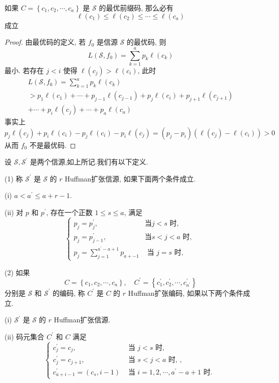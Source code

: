 \begin{lemma}
    如果 $ C=\left\{c_{1}, c_{2}, \cdots, c_{a}\right\} $ 是 $ \mathscr{S} $ 的最优前缀码, 那么必有
$$
\ell\left(c_{1}\right) \leq \ell\left(c_{2}\right) \leq \cdots \leq \ell\left(c_{a}\right)
$$
成立
\end{lemma}
\begin{proof}
 由最优码的定义, 若 $ f_{0} $ 是信源 $ \mathscr{S} $ 的最优码, 则
$$
L\left(\mathscr{S}, f_{0}\right)=\sum_{k=1}^{a} p_{k} \ell\left(c_{k}\right)
$$
最小. 若存在 $ j<i $ 使得 $ \ell\left(c_{j}\right)>\ell\left(c_{i}\right) $, 此时
$$
\begin{array}{c}
L\left(\mathscr{S}, f_{0}\right)=\sum\limits_{k=1}^{a} p_{k} \ell\left(c_{k}\right) \\
>p_{1} \ell\left(c_{1}\right)+\cdots+p_{j-1} \ell\left(c_{j-1}\right)+p_{j} \ell\left(c_{i}\right)+p_{j+1} \ell\left(c_{j+1}\right) \\
+\cdots+p_{i} \ell\left(c_{j}\right)+\cdots+p_{a} \ell\left(c_{a}\right)
\end{array}
$$
事实上
$$
p_{j} \ell\left(c_{j}\right)+p_{i} \ell\left(c_{i}\right)-p_{j} \ell\left(c_{i}\right)-p_{i} \ell\left(c_{j}\right)=\left(p_{j}-p_{i}\right)\left(\ell\left(c_{j}\right)-\ell\left(c_{i}\right)\right)>0
$$
从而 $ f_{0} $ 不是最优码.
\end{proof}

\begin{definition}
    设 $ \mathscr{S}, \mathscr{S}^{\prime} $ 是两个信源,如上所记.我们有以下定义.
    
(1) 称 $ \mathscr{S}^{\prime} $ 是 $ \mathscr{S} $ 的 $ r $ Huffman扩张信源, 如果下面两个条件成立.

(i) $ a<a^{\prime} \leq a+r-1 $.

(ii) 对 $ p $ 和 $ p^{\prime} $, 存在一个正数 $ 1 \leq s \leq a $, 满足
$$
\left\{\begin{array}{ll}
p_{j}=p_{j}^{\prime}, & \text {当} j<s \text { 时, } \\
p_{j}=p_{j-1}^{\prime}, & \text {当} s<j<a \text { 时, } \\
p_{j}=\sum\limits_{j=1}^{a^{\prime}-a+1} p_{a+-1} & \text { 当 } j=s \text { 时, }
\end{array}\right.
$$

(2) 如果
$$
C=\left\{c_{1}, c_{2}, \cdots, c_{a}\right\}, \quad C^{\prime}=\left\{c_{1}^{\prime}, c_{2}^{\prime}, \cdots, c_{a^{\prime}}^{\prime}\right\}
$$
分别是 $ \mathscr{S} $ 和 $ \mathscr{S}^{\prime} $ 的编码, 称 $ C^{\prime} $ 是 $ C $ 的 $ r $ Huffman扩张编码, 如果以下两个条件成立.

(i) $ \mathscr{S}^{\prime} $ 是 $ \mathscr{S} $ 的 $ r $ Huffman扩张信源.

(ii) 码元集合 $ C^{\prime} $ 和 $ C $ 满足
$$
\left\{\begin{array}{ll}
c_{j}^{\prime}=c_{j}, & \text { 当 } j<s \text { 时, } \\
c_{j}^{\prime}=c_{j+1}, & \text { 当 } s<j<a \text { 时, }, \\
c_{a+i-1}^{\prime}=\left(c_{s}, i-1\right) & \text { 当 } i=1,2, \cdots, a^{\prime}-a+1 \text { 时. }
\end{array}\right.
$$
\end{definition}


